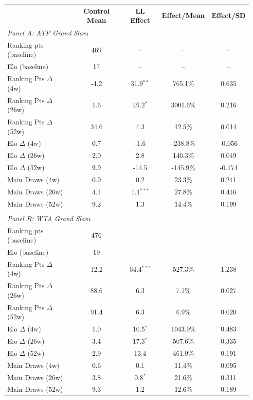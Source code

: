 \begin{tabular}{lcccc}
\toprule
 & Control Mean & LL Effect & Effect/Mean & Effect/SD \\
\midrule
\multicolumn{5}{l}{\textit{Panel A: ATP Grand Slam}} \\
\midrule
Ranking pts (baseline) & 469 & -- & -- & -- \\
Elo (baseline) & 17 & -- & -- & -- \\[0.3em]
\quad Ranking Pts $\Delta$ (4w) & -4.2 & 31.9$^{**}$ & 765.1\% & 0.635 \\
\quad Ranking Pts $\Delta$ (26w) & 1.6 & 49.2$^{*}$ & 3001.6\% & 0.216 \\
\quad Ranking Pts $\Delta$ (52w) & 34.6 & 4.3 & 12.5\% & 0.014 \\

\quad Elo $\Delta$ (4w) & 0.7 & -1.6 & -238.8\% & -0.056 \\
\quad Elo $\Delta$ (26w) & 2.0 & 2.8 & 140.3\% & 0.049 \\
\quad Elo $\Delta$ (52w) & 9.9 & -14.5 & -145.9\% & -0.174 \\

\quad Main Draws (4w) & 0.9 & 0.2 & 23.3\% & 0.241 \\
\quad Main Draws (26w) & 4.1 & 1.1$^{***}$ & 27.8\% & 0.446 \\
\quad Main Draws (52w) & 9.2 & 1.3 & 14.4\% & 0.199 \\

\\[0.5em]
\multicolumn{5}{l}{\textit{Panel B: WTA Grand Slam}} \\
\midrule
Ranking pts (baseline) & 476 & -- & -- & -- \\
Elo (baseline) & 19 & -- & -- & -- \\[0.3em]
\quad Ranking Pts $\Delta$ (4w) & 12.2 & 64.4$^{***}$ & 527.3\% & 1.238 \\
\quad Ranking Pts $\Delta$ (26w) & 88.6 & 6.3 & 7.1\% & 0.027 \\
\quad Ranking Pts $\Delta$ (52w) & 91.4 & 6.3 & 6.9\% & 0.020 \\

\quad Elo $\Delta$ (4w) & 1.0 & 10.5$^{*}$ & 1043.9\% & 0.483 \\
\quad Elo $\Delta$ (26w) & 3.4 & 17.3$^{*}$ & 507.6\% & 0.335 \\
\quad Elo $\Delta$ (52w) & 2.9 & 13.4 & 461.9\% & 0.191 \\

\quad Main Draws (4w) & 0.6 & 0.1 & 11.4\% & 0.095 \\
\quad Main Draws (26w) & 3.8 & 0.8$^{*}$ & 21.6\% & 0.311 \\
\quad Main Draws (52w) & 9.3 & 1.2 & 12.6\% & 0.189 \\


\end{tabular}
